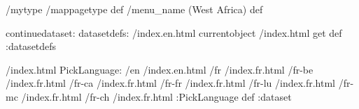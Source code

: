 \begin{ingrid}
/mytype /mappagetype def
/menu_name (West Africa) def

continuedataset:
datasetdefs:
/index.en.html currentobject /index.html get def
:datasetdefs

/index.html {
PickLanguage:
/en /index.en.html
/fr /index.fr.html
/fr-be /index.fr.html
/fr-ca /index.fr.html
/fr-fr /index.fr.html
/fr-lu /index.fr.html
/fr-mc /index.fr.html
/fr-ch /index.fr.html
:PickLanguage
} def
:dataset

\end{ingrid}
